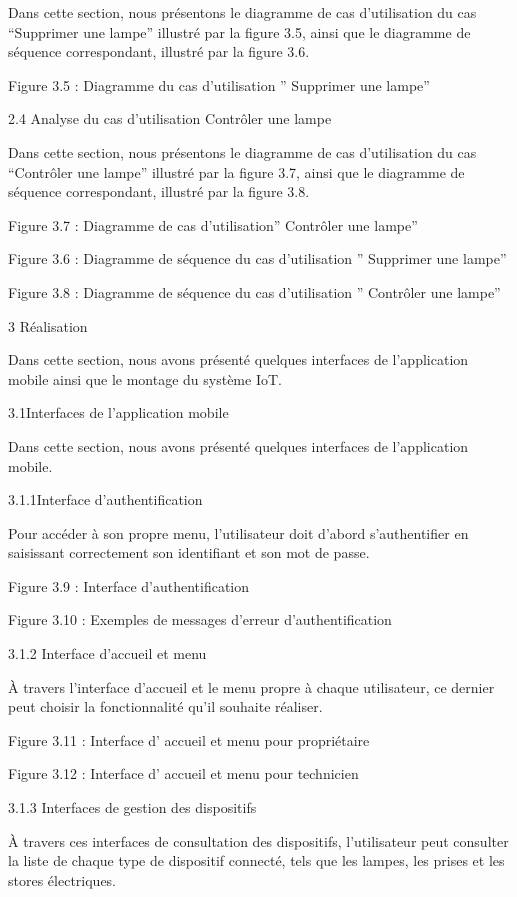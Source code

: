 \documentclass{article}
\begin{document}
Dans cette section, nous présentons le diagramme de cas d'utilisation du cas “Supprimer une lampe”  illustré par la figure 3.5, ainsi que le diagramme de séquence correspondant, illustré par la figure 3.6.

Figure 3.5 : Diagramme du cas d’utilisation ” Supprimer une lampe”

2.4 Analyse du cas d’utilisation Contrôler une lampe

Dans cette section, nous présentons le diagramme de cas d'utilisation du cas “Contrôler une lampe”  illustré par la figure 3.7, ainsi que le diagramme de séquence correspondant, illustré par la figure 3.8.

Figure 3.7 : Diagramme de cas d’utilisation” Contrôler une lampe”

Figure 3.6 : Diagramme de séquence du cas d’utilisation ” Supprimer une lampe”

Figure 3.8 : Diagramme de séquence du cas d’utilisation ” Contrôler une lampe”

3 Réalisation 

Dans cette section, nous avons présenté quelques interfaces de l’application mobile ainsi que le montage du système IoT.

3.1Interfaces de l’application mobile

Dans cette section, nous avons présenté quelques interfaces de l’application mobile.

3.1.1Interface d’authentification

Pour accéder à son propre menu, l’utilisateur doit d’abord s’authentifier en saisissant correctement son identifiant et son mot de passe.

Figure 3.9 : Interface d’authentification

Figure 3.10 : Exemples de messages d’erreur d’authentification

3.1.2 Interface d’accueil  et  menu

À travers l’interface d’accueil et le menu propre à chaque utilisateur, ce dernier peut choisir la fonctionnalité qu’il souhaite réaliser.

Figure 3.11 : Interface d’ accueil et menu pour propriétaire

Figure 3.12 : Interface d’ accueil et menu pour technicien

3.1.3 Interfaces de gestion des dispositifs

À travers ces interfaces de consultation des dispositifs, l’utilisateur peut consulter la liste de chaque type de dispositif connecté, tels que les lampes, les prises et les stores électriques.
\end{document}
